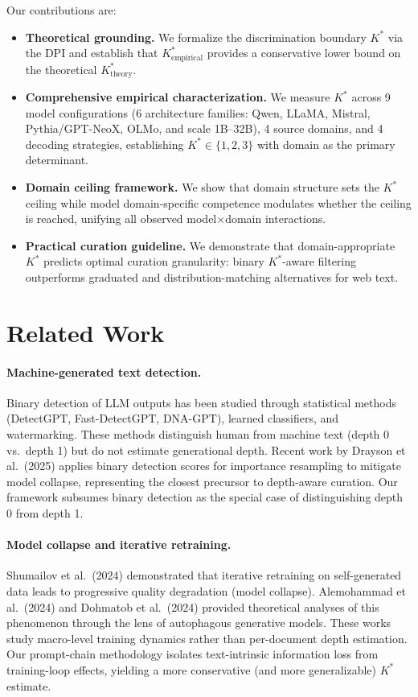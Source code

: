 \documentclass[11pt,a4paper]{article}
\newcommand{\kstar}{K^{*}}
\begin{document}
Our contributions are:
\begin{itemize}
  \item \textbf{Theoretical grounding.} We formalize the discrimination boundary $\kstar$ via the DPI and establish that $\kstar_{\mathrm{empirical}}$ provides a conservative lower bound on the theoretical $\kstar_{\mathrm{theory}}$.
  \item \textbf{Comprehensive empirical characterization.} We measure $\kstar$ across 9 model configurations (6 architecture families: Qwen, LLaMA, Mistral, Pythia/GPT-NeoX, OLMo, and scale 1B--32B), 4 source domains, and 4 decoding strategies, establishing $\kstar \in \{1,2,3\}$ with domain as the primary determinant.
  \item \textbf{Domain ceiling framework.} We show that domain structure sets the $\kstar$ ceiling while model domain-specific competence modulates whether the ceiling is reached, unifying all observed model$\times$domain interactions.
  \item \textbf{Practical curation guideline.} We demonstrate that domain-appropriate $\kstar$ predicts optimal curation granularity: binary $\kstar$-aware filtering outperforms graduated and distribution-matching alternatives for web text.
\end{itemize}

\section{Related Work}

\paragraph{Machine-generated text detection.}
Binary detection of LLM outputs has been studied through statistical methods (DetectGPT, Fast-DetectGPT, DNA-GPT), learned classifiers, and watermarking.
These methods distinguish human from machine text (depth 0 vs.\ depth 1) but do not estimate generational depth.
Recent work by Drayson et al.\ (2025) applies binary detection scores for importance resampling to mitigate model collapse, representing the closest precursor to depth-aware curation. Our framework subsumes binary detection as the special case of distinguishing depth 0 from depth 1.

\paragraph{Model collapse and iterative retraining.}
Shumailov et al.\ (2024) demonstrated that iterative retraining on self-generated data leads to progressive quality degradation (model collapse).
Alemohammad et al.\ (2024) and Dohmatob et al.\ (2024) provided theoretical analyses of this phenomenon through the lens of autophagous generative models.
These works study macro-level training dynamics rather than per-document depth estimation. Our prompt-chain methodology isolates text-intrinsic information loss from training-loop effects, yielding a more conservative (and more generalizable) $\kstar$ estimate.
\end{document}
